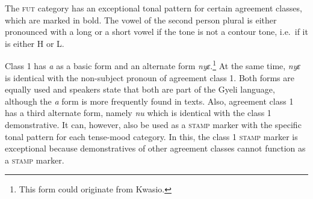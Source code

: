 \begin{table}
\caption{Patterns of \textsc{stamp} markers in different {\AGR} classes and TM categories}
\label{Tab:SCOPAGR}
\end{table}

The \textsc{fut} category has an exceptional tonal pattern for certain agreement classes, which are marked in bold. The vowel of the second person plural is either pronounced with a long or a short vowel if the tone is not a contour tone, i.e.\ if it is either H or L. 


Class 1 has {\itshape a} as a basic form and an alternate form {\itshape nyɛ}.\footnote{This form could originate from Kwasio.} At the same time, {\itshape nyɛ} is identical with the non-subject pronoun of agreement class 1. Both forms are equally used and speakers state that both are part of the Gyeli language, although the {\itshape a} form is more frequently found in texts.  Also, agreement class 1 has a third alternate form, namely {\itshape nu} which is identical with the class 1 demonstrative. It can, however, also be used as a \textsc{stamp} marker with the specific tonal pattern for each tense-mood category. In this, the class 1 \textsc{stamp} marker is exceptional because demonstratives of other agreement classes cannot function as a \textsc{stamp} marker.

